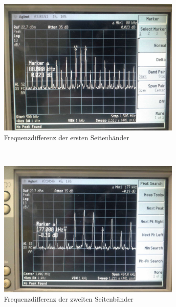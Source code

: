 \begin{figure}
	\begin{subfigure}[t]{0.5\textwidth}
		\centering
		\includegraphics[scale=0.17]{../Grafiken/Frequenzspektrum_d_FreqModuliert_1.jpg}
		\caption{Frequenzdifferenz der ersten Seitenbänder\label{fig:frequenzspektrum_d_freqmoduliert_1}}
	\end{subfigure}%
	~
	\begin{subfigure}[t]{0.5\textwidth}
		\centering
		\includegraphics[scale=0.17]{../Grafiken/Frequenzspektrum_d_FreqModuliert_2.jpg}
		\caption{Frequenzdifferenz der zweiten Seitenbänder\label{fig:frequenzspektrum_d_freqmoduliert_2}}
	\end{subfigure}
	\caption{\label{fig:frequenzspektrum_d_freqmoduliert}}
\end{figure}
\FloatBarrier
